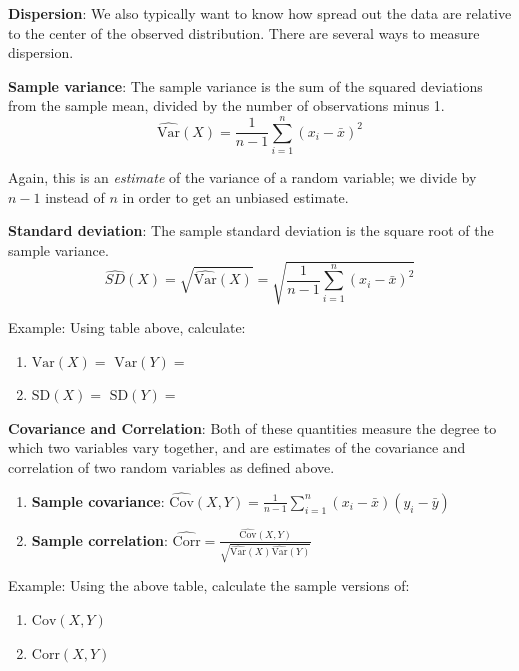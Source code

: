 \documentclass[]{book}
\providecommand{\tightlist}{%
  \setlength{\itemsep}{0pt}\setlength{\parskip}{0pt}}
\newcommand{\SD}{\mathrm{SD}}
\theoremstyle{definition}
\theoremstyle{definition}
\theoremstyle{definition}
\theoremstyle{remark}
\let\BeginKnitrBlock\begin \let\EndKnitrBlock\end
\begin{document}
\textbf{Dispersion}: We also typically want to know how spread out the
data are relative to the center of the observed distribution. There are
several ways to measure dispersion.

\textbf{Sample variance}: The sample variance is the sum of the squared
deviations from the sample mean, divided by the number of observations
minus 1.
\[ \hat{\text{Var}}(X) = \frac{1}{n-1}\sum_{i = 1}^n (x_i - \bar{x})^2\]

Again, this is an \emph{estimate} of the variance of a random variable;
we divide by \(n - 1\) instead of \(n\) in order to get an unbiased
estimate.

\textbf{Standard deviation}: The sample standard deviation is the square
root of the sample variance.
\[ \hat{SD}(X) = \sqrt{\hat{\text{Var}}(X)} = \sqrt{\frac{1}{n-1}\sum_{i = 1}^n (x_i - \bar{x})^2}\]

\begin{framed}
Example: Using table above, calculate: 
\begin{enumerate}
\item $\text{Var}(X) = $ \hspace{1.5cm} $\text{Var}(Y) =$
\item $\SD(X) = $ \hspace{1.65cm} $\SD(Y) =$
\end{enumerate}
\end{framed}

\textbf{Covariance and Correlation}: Both of these quantities measure
the degree to which two variables vary together, and are estimates of
the covariance and correlation of two random variables as defined above.

\begin{enumerate}
\def\labelenumi{\arabic{enumi}.}
\tightlist
\item
  \textbf{Sample covariance}:
  \(\hat{\text{Cov}}(X,Y) = \frac{1}{n-1}\sum_{i = 1}^n(x_i - \bar{x})(y_i - \bar{y})\)
\item
  \textbf{Sample correlation}:
  \(\hat{\text{Corr}} = \frac{\hat{\text{Cov}}(X,Y)}{\sqrt{\hat{\text{Var}}(X)\hat{\text{Var}}(Y)}}\)
\end{enumerate}

\BeginKnitrBlock{example}
\protect\hypertarget{exm:unnamed-chunk-94}{}{\label{exm:unnamed-chunk-94}
}Example: Using the above table, calculate the sample versions of:

\begin{enumerate}
\def\labelenumi{\arabic{enumi}.}
\tightlist
\item
  \(\text{Cov}(X,Y)\)
\item
  \(\text{Corr}(X, Y)\)
\end{enumerate}
\EndKnitrBlock{example}
\end{document}
